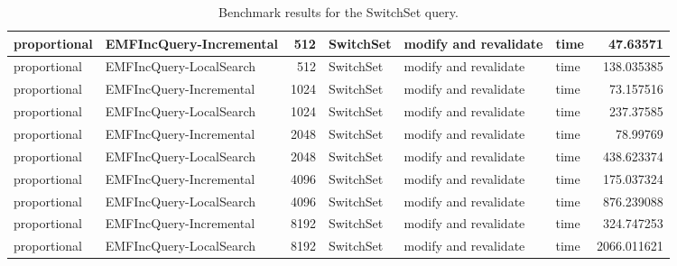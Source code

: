 \begin{table}
\begin{tabular}{| l | l | r | l | l | l | r |}
proportional & EMFIncQuery-Incremental & 512 & SwitchSet & modify and revalidate & time & 47.63571\\\hline
proportional & EMFIncQuery-LocalSearch & 512 & SwitchSet & modify and revalidate & time & 138.035385\\\hline
proportional & EMFIncQuery-Incremental & 1024 & SwitchSet & modify and revalidate & time & 73.157516\\\hline
proportional & EMFIncQuery-LocalSearch & 1024 & SwitchSet & modify and revalidate & time & 237.37585\\\hline
proportional & EMFIncQuery-Incremental & 2048 & SwitchSet & modify and revalidate & time & 78.99769\\\hline
proportional & EMFIncQuery-LocalSearch & 2048 & SwitchSet & modify and revalidate & time & 438.623374\\\hline
proportional & EMFIncQuery-Incremental & 4096 & SwitchSet & modify and revalidate & time & 175.037324\\\hline
proportional & EMFIncQuery-LocalSearch & 4096 & SwitchSet & modify and revalidate & time & 876.239088\\\hline
proportional & EMFIncQuery-Incremental & 8192 & SwitchSet & modify and revalidate & time & 324.747253\\\hline
proportional & EMFIncQuery-LocalSearch & 8192 & SwitchSet & modify and revalidate & time & 2066.011621\\\hline

\end{tabular}\caption{Benchmark results for the \textsf{SwitchSet} query.}
\label{tab:revalidation-switchset}
\end{table}
